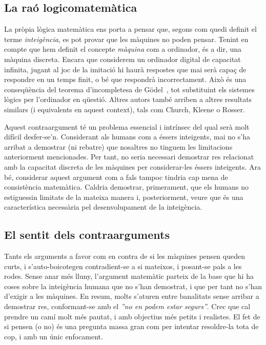 \documentclass[a4paper, 11pt]{article}
\begin{document}
\subsection*{La raó logicomatemàtica}

La pròpia lògica matemàtica ens porta a pensar que, segons com quedi definit el terme \textit{inte\lgem{}igència}, es
pot provar que les màquines no poden pensar. Tenint en compte que hem definit el concepte \textit{màquina} com a
ordinador, és a dir, una màquina discreta. Encara que considerem un ordinador digital de capacitat infinita, jugant al
joc de la imitació hi haurà respostes que mai serà capaç de respondre en un temps finit, o bé que respondrà
incorrectament. Això és una conseqüència del teorema d'incompletesa de Gödel~\cite{bib:wiki:tma_godel}, tot substituint
els sistemes lògics per l'ordinador en qüestió. Altres autors també arriben a altres resultats similars (i equivalents
en aquest context), tals com Church, Kleene o Rosser.

Aquest contraargument té un problema essencial i intrínsec del qual serà molt difícil desfer-se'n. Considerant als
humans com a éssers inte\lgem{}igents, mai no s'ha arribat a demostrar (ni rebatre) que nosaltres no tinguem les
limitacions anteriorment mencionades. Per tant, no seria necessari demostrar res relacionat amb la capacitat discreta
de les màquines per considerar-les éssers inte\lgem{}igents. Ara bé, considerar aquest argument com a fals tampoc
tindria cap mena de consistència matemàtica. Caldria demostrar, primerament, que els humans no estiguessin limitats de
la mateixa manera i, posteriorment, veure que és una característica necessària pel desenvolupament de la
inte\lgem{}igència.

\subsection*{El sentit dels contraarguments}

Tants els arguments a favor com en contra de si les màquines pensen queden curts, i s'auto-boicotegen contradient-se a
si mateixos, i posant-se pals a les rodes. Sense anar més lluny, l'argument matemàtic parteix de la base que hi ha
coses sobre la inte\lgem{}igència humana que no s'han demostrat, i que per tant no s'han d'exigir a les màquines. En
resum, molts s'aturen entre banalitats sense arribar a demostrar res, conformant-se amb el \textit{''no en podem estar
  segurs''}. Crec que cal prendre un camí molt més pautat, i amb objectius més petits i realistes. El fet de si pensen (o
no) és una pregunta massa gran com per intentar resoldre-la tota de cop, i amb un únic enfocament.
\end{document}
